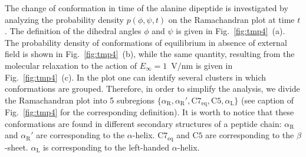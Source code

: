 \documentclass[a4paper,preprint,unsortedaddress,onecolumn]{revtex4-1}
\newcommand{\confaa}[0]{{\alpha_{\textrm{R}}}}
\newcommand{\confab}[0]{{\alpha_{\textrm{R}}'}}
\newcommand{\confba}[0]{{\textrm{C}7_{\textrm{eq}}}}
\newcommand{\confbb}[0]{{\textrm{C}5}}
\newcommand{\confc}[0]{{\alpha_{\textrm{L}}}}
\begin{document}
The change of conformation in time of the alanine dipeptide is
investigated by analyzing the probability density $p(\phi,\psi,t)$ on
the Ramachandran plot at time $t$. The definition of the dihedral
angles $\phi$ and $\psi$ is given in Fig.~\ref{fig:tmp4}~(a).
The probability density of conformations of equilibrium in absence of external field is shown in Fig.~\ref{fig:tmp4}~(b), while the same quantity, resulting from the molecular relaxation to the action of $E_{\infty} = 1$~V/nm is
given in Fig.~\ref{fig:tmp4}~(c). In the plot one can identify several clusters
in which conformations are grouped.
Therefore, in order to simplify the analysis, we divide the
Ramachandran plot into 5 subregions $\{\confaa, \confab, \confba, \confbb, \confc\}$
(see caption of Fig.~\ref{fig:tmp4} for the corresponding definition).
It is worth to notice that these conformations
are found in different secondary structures of a peptide chain:
$\confaa$ and $\confab$ are
corresponding to the $\alpha$-helix. $\confba$ and $\confbb$ are
corresponding to the $\beta$-sheet. $\confc$ is corresponding to the
left-handed $\alpha$-helix.
\end{document}

